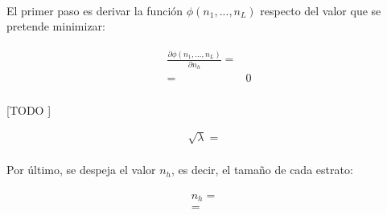 \documentclass{article}
\begin{document}
      \paragraph{}
      El primer paso es derivar la función $\phi(n_1, ..., n_L)$ respecto del valor que se pretende minimizar:

      \begin{align}
      \label{eq:derivate_2}
        \begin{split}
          \frac{\partial \phi(n_1, ..., n_L)}{\partial n_h} =& \\
          =& 0
        \end{split}
      \end{align}

      \paragraph{}
      [TODO ]

      \begin{align}
        \sqrt{\lambda} =&
      \end{align}

      \paragraph{}
      Por último, se despeja el valor $n_h$, es decir, el tamaño de cada estrato:

      \begin{align}
        \begin{split}
          n_h =& \\
          =&
        \end{split}
      \end{align}



  \nocite{muest2017}
  \nocite{sarndal2003model}

  
  
\end{document}
